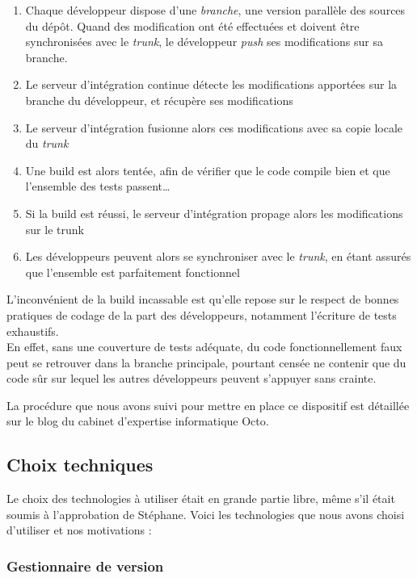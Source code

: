 \begin{enumerate}
	\item Chaque développeur dispose d'une \textit{branche}, une version parallèle des sources du dépôt. Quand des modification ont été effectuées et doivent être synchronisées avec le \textit{trunk}, le développeur \textit{push} ses modifications sur sa branche.
	\item Le serveur d'intégration continue détecte les modifications apportées sur la branche du développeur, et récupère ses modifications
	\item Le serveur d'intégration fusionne alors ces modifications avec sa copie locale du \textit{trunk}
	\item Une build est alors tentée, afin de vérifier que le code compile bien et que l'ensemble des tests passent\ldots
	\item Si la build est réussi, le serveur d'intégration propage alors les modifications sur le trunk
	\item Les développeurs peuvent alors se synchroniser avec le \textit{trunk}, en étant assurés que l'ensemble est parfaitement fonctionnel
\end{enumerate}
L'inconvénient de la build incassable est qu'elle repose sur le respect de bonnes pratiques de codage de la part des développeurs, notamment l'écriture de tests exhaustifs.\\
En effet, sans une couverture de tests adéquate, du code fonctionnellement faux peut se retrouver dans la branche principale, pourtant censée ne contenir que du code sûr sur lequel les autres développeurs peuvent s'appuyer sans crainte.  

La procédure que nous avons suivi pour mettre en place ce dispositif est détaillée sur le blog du cabinet d'expertise informatique Octo\cite{build}.

\subsection{Choix techniques}

Le choix des technologies à utiliser était en grande partie libre, même s'il était soumis à l'approbation de Stéphane. Voici les technologies que nous avons choisi d'utiliser et nos motivations :

\subsubsection{Gestionnaire de version}

